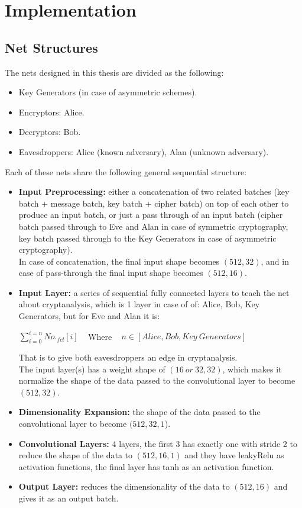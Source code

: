 \documentclass[a4paper, 12pt]{report}
\begin{document}
\chapter{Implementation}\label{sec:implementation}
\section{\textbf{Net Structures}}
The nets designed in this thesis are divided as the following:
\begin{itemize}
	\item Key Generators (in case of asymmetric schemes).
	\item Encryptors: Alice.
	\item Decryptors: Bob.
	\item Eavesdroppers: Alice (known adversary), Alan (unknown adversary).
\end{itemize}
Each of these nets share the following general sequential structure:
\begin{itemize}
	\item \textbf{Input Preprocessing:} either a concatenation of two related batches (key batch + message batch, key batch + cipher batch) on top of each other to produce an input batch, or just a pass through of an input batch (cipher batch passed through to Eve and Alan in case of symmetric cryptography, key batch passed through to the Key Generators in case of asymmetric cryptography).\\
	In case of concatenation, the final input shape becomes $ (512, 32) $, and in case of pass-through the final input shape becomes $ (512, 16) $.
	\item \textbf{Input Layer:} a series of sequential fully connected layers to teach the net about cryptanalysis, which is 1 layer in case of of: Alice, Bob, Key Generators, but for Eve and Alan it is: 
	\begin{center}
		$ \sum_{i = 0}^{i=n} No._{fcl}[i] $ ~ Where ~
		$ n \in [Alice, Bob, Key ~ Generators] $
	\end{center}
	That is to give both eavesdroppers an edge in cryptanalysis.\\
	The input layer(s) has a weight shape of $ (16 ~ or ~ 32, 32) $, which makes it normalize the shape of the data passed to the convolutional layer to become $ (512, 32) $.
	\item \textbf{Dimensionality Expansion:}  the shape of the data passed to the convolutional layer to become $ (512, 32, 1 $).
	\item \textbf{Convolutional Layers:} 4 layers, the first 3 has exactly one with stride 2 to reduce the shape of the data to $ (512, 16, 1) $ and they have leakyRelu as activation functions, the final layer has tanh as an activation function.
	\item \textbf{Output Layer:} reduces the dimensionality of the data to $ (512, 16) $ and gives it as an output batch. 
\end{itemize}
\end{document}
